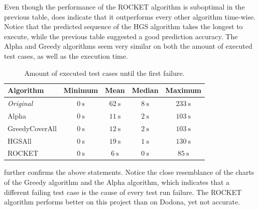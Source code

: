 \noindent Even though the performance of the ROCKET algorithm is suboptimal in the previous table,  does indicate that it outperforms every other algorithm time-wise. Notice that the predicted sequence of the HGS algorithm takes the longest to execute, while the previous table suggested a good prediction accuracy. The Alpha and Greedy algorithms seem very similar on both the amount of executed test cases, as well as the execution time. \\

\begin{table}[h]
	\centering
	\begin{tabularx}{\textwidth}{|X||c|c|c|c|}
		\hline
		\textbf{Algorithm} & \textbf{Minimum} & \textbf{Mean} & \textbf{Median} & \textbf{Maximum}\\
		
		\hline
		
		\emph{Original} & $\SI{0}{\second}$ & $\SI{62}{\second}$ & $\SI{8}{\second}$ & $\SI{233}{\second}$\\

		\hline
		
		Alpha & $\SI{0}{\second}$ & $\SI{11}{\second}$ & $\SI{2}{\second}$ & $\SI{103}{\second}$\\
		
		\hline
		
		GreedyCoverAll & $\SI{0}{\second}$ & $\SI{12}{\second}$ & $\SI{2}{\second}$ & $\SI{103}{\second}$\\
		
		\hline
		
		HGSAll & $\SI{0}{\second}$ & $\SI{19}{\second}$ & $\SI{1}{\second}$ & $\SI{130}{\second}$\\
		
		\hline
		
		ROCKET & $\SI{0}{\second}$ & $\SI{6}{\second}$ & $\SI{0}{\second}$ & $\SI{85}{\second}$\\
		
		\hline
	\end{tabularx}
	\caption{Amount of executed test cases until the first failure.}
	\label{tbl:rq5-first-failure-duration}
\end{table}

\noindent {} further confirms the above statements. Notice the close resemblance of the charts of the Greedy algorithm and the Alpha algorithm, which indicates that a different failing test case is the cause of every test run failure. The ROCKET algorithm performs better on this project than on Dodona, yet not accurate.

